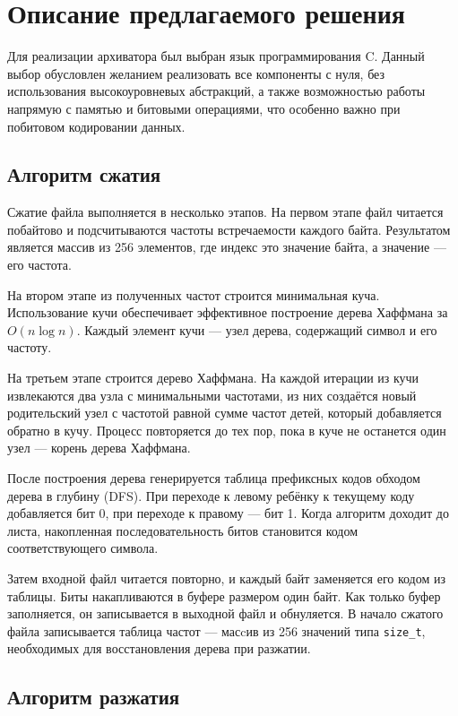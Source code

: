 \documentclass[a4paper]{article}
\begin{document}
\section{Описание предлагаемого решения}

Для реализации архиватора был выбран язык программирования C. Данный выбор обусловлен желанием реализовать все компоненты с нуля, без использования высокоуровневых абстракций, а также возможностью работы напрямую с памятью и битовыми операциями, что особенно важно при побитовом кодировании данных.

\subsection*{Алгоритм сжатия}

Сжатие файла выполняется в несколько этапов. На первом этапе файл читается побайтово и подсчитываются частоты встречаемости каждого байта. Результатом является массив из 256 элементов, где индекс это значение байта, а значение --- его частота.

На втором этапе из полученных частот строится минимальная куча. Использование кучи обеспечивает эффективное построение дерева Хаффмана за $O(n \log n)$. Каждый элемент кучи --- узел дерева, содержащий символ и его частоту.

На третьем этапе строится дерево Хаффмана. На каждой итерации из кучи извлекаются два узла с минимальными частотами, из них создаётся новый родительский узел с частотой равной сумме частот детей, который добавляется обратно в кучу. Процесс повторяется до тех пор, пока в куче не останется один узел --- корень дерева Хаффмана.

После построения дерева генерируется таблица префиксных кодов обходом дерева в глубину (DFS). При переходе к левому ребёнку к текущему коду добавляется бит 0, при переходе к правому --- бит 1. Когда алгоритм доходит до листа, накопленная последовательность битов становится кодом соответствующего символа.

Затем входной файл читается повторно, и каждый байт заменяется его кодом из таблицы. Биты накапливаются в буфере размером один байт. Как только буфер заполняется, он записывается в выходной файл и обнуляется. В начало сжатого файла записывается таблица частот --- масcив из 256 значений типа \texttt{size\_t}, необходимых для восстановления дерева при разжатии.

\subsection*{Алгоритм разжатия}
\end{document}

